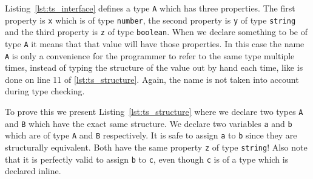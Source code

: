 \documentclass{article}
\newcommand{\ttt}[1]{\texttt{#1}}
\begin{document}
Listing~\ref{lst:ts_interface} defines a type \ttt{A} which has three properties.
The first property is \ttt{x} which is of type \ttt{number}, the second property is \ttt{y} of type \ttt{string} and the third property is \ttt{z} of type \ttt{boolean}.
When we declare something to be of type \ttt{A} it means that that value will have those properties.
In this case the name \ttt{A} is only a convenience for the programmer to refer to the same type multiple times, instead of typing the structure of the value out by hand each time, like is done on line 11 of \ref{lst:ts_structure}.
Again, the name is not taken into account during type checking.

To prove this we present Listing~\ref{lst:ts_structure} where we declare two types \ttt{A} and \ttt{B} which have the exact same structure.
We declare two variables \ttt{a} and \ttt{b} which are of type \ttt{A} and \ttt{B} respectively.
It is safe to assign \ttt{a} to \ttt{b} since they are structurally equivalent.
Both have the same property \ttt{z} of type \ttt{string}!
Also note that it is perfectly valid to assign \ttt{b} to \ttt{c}, even though \ttt{c} is of a type which is declared inline.
\noindent
\begin{center}
    \begin{minipage}{.40\textwidth}
    
    \end{minipage}
\end{center}
\end{document}
